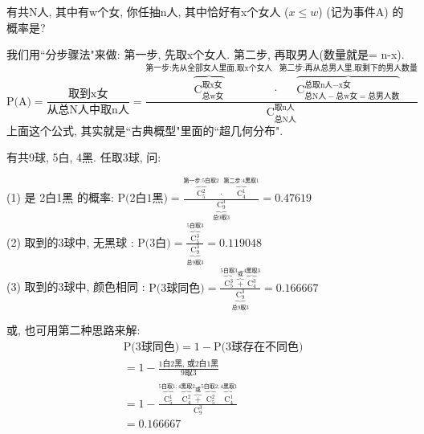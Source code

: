 \documentclass[UTF8]{ctexart}
\begin{document}
	
	\begin{myEnvSample}
		有共N人, 其中有w个女, 你任抽n人, 其中恰好有x个女人 ($x \leq w$) (记为事件A) 的概率是? 
		
		我们用``分步骤法"来做: 第一步, 先取x个女人. 第二步, 再取男人(数量就是= n-x). \\

$
\text{P(A)}=\dfrac{\text{取到x女}}{\text{从总N人中取n人}}=\dfrac{\overset{\text{第一步:先从全部女人里面,取x个女人}}{\overbrace{\text{C}_{\text{总w女}}^{\text{取x女}}}}\cdot \overset{\text{第二步:再从总男人里,取剩下的男人数量}}{\overbrace{\text{C}_{\text{总N人}-\text{总w女}=\text{总男人数}}^{\text{总取n人}-\text{x女}}}}}{\text{C}_{\text{总N人}}^{\text{取n人}}}
$ \\

上面这个公式, 其实就是``古典概型"里面的``超几何分布".
	\end{myEnvSample}
	
	
	
	\begin{myEnvSample}
		有共9球, 5白, 4黑. 任取3球, 问:
		
		(1) 是 2白1黑 的概率: 		
		$
		\text{P(2白1黑)}=\frac{\overset{\text{第一步:5白取}2}{\overbrace{\text{C}_{5}^{2}}}\cdot \overset{\text{第二步:4黑取}1}{\overbrace{\text{C}_{4}^{1}}}}{\underset{\text{总9取}3}{\underbrace{\text{C}_{9}^{3}}}}=0.47619
		$ \\
		
		(2) 取到的3球中, 无黑球 :		
		$
		\text{P(3白)}=\frac{\overset{5\text{白取}3}{\overbrace{\text{C}_{5}^{3}}}}{\underset{\text{总9取}3}{\underbrace{\text{C}_{9}^{3}}}}=0.119048
		$ \\
		
		(3) 取到的3球中, 颜色相同 : 		
		$
		\text{P(3球同色)}=\frac{\overset{5\text{白取}3}{\overbrace{\text{C}_{5}^{3}}}\overset{\text{或}}{\overbrace{+}}\overset{4\text{黑取}3}{\overbrace{\text{C}_{4}^{3}}}}{\underset{\text{总9取}3}{\underbrace{\text{C}_{9}^{3}}}}=0.166667
		$
		
		或, 也可用第二种思路来解:  		
		\begin{align*}  %
	&\text{P(3球同色)}=1-\text{P(3球存在不同色)}\\
&=1-\frac{1\text{白2黑,\ 或2白1黑}}{9\text{取}3}\\
&=1-\frac{\overset{5\text{白取}1; }{\overbrace{\text{C}_{5}^{1}}}\overset{4\text{黑取}2}{\overbrace{\text{C}_{4}^{2}}}\overset{\text{或}}{\overbrace{+}}\overset{5\text{白取}2; }{\overbrace{\text{C}_{5}^{2}}}\overset{4\text{黑取}1}{\overbrace{\text{C}_{4}^{1}}}}{\text{C}_{9}^{3}}\\
&=0.166667
		\end{align*}

	\end{myEnvSample}
	
\end{document}
